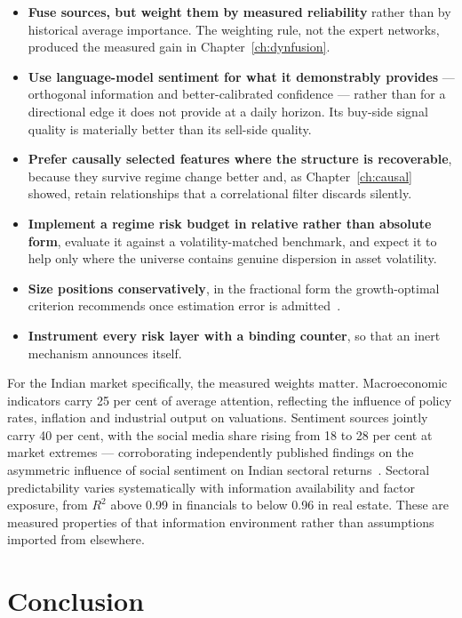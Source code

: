 \begin{itemize}
\item \textbf{Fuse sources, but weight them by measured reliability} rather than by historical
average importance. The weighting rule, not the expert networks, produced the measured gain in
Chapter~\ref{ch:dynfusion}.
\item \textbf{Use language-model sentiment for what it demonstrably provides} --- orthogonal
information and better-calibrated confidence --- rather than for a directional edge it does not
provide at a daily horizon. Its buy-side signal quality is materially better than its sell-side
quality.
\item \textbf{Prefer causally selected features where the structure is recoverable}, because they
survive regime change better and, as Chapter~\ref{ch:causal} showed, retain relationships that a
correlational filter discards silently.
\item \textbf{Implement a regime risk budget in relative rather than absolute form}, evaluate it
against a volatility-matched benchmark, and expect it to help only where the universe contains
genuine dispersion in asset volatility.
\item \textbf{Size positions conservatively}, in the fractional form the growth-optimal criterion
recommends once estimation error is admitted~\cite{kelly1956}.
\item \textbf{Instrument every risk layer with a binding counter}, so that an inert mechanism
announces itself.
\end{itemize}

For the Indian market specifically, the measured weights matter. Macroeconomic indicators carry 25
per cent of average attention, reflecting the influence of policy rates, inflation and industrial
output on valuations. Sentiment sources jointly carry 40 per cent, with the social media share
rising from 18 to 28 per cent at market extremes --- corroborating independently published findings
on the asymmetric influence of social sentiment on Indian sectoral
returns~\cite{khan2025asymmetric}. Sectoral predictability varies systematically with information
availability and factor exposure, from $R^2$ above 0.99 in financials to below 0.96 in real estate.
These are measured properties of that information environment rather than assumptions imported from
elsewhere.

\section{Conclusion}
\label{sec:concl-main}

